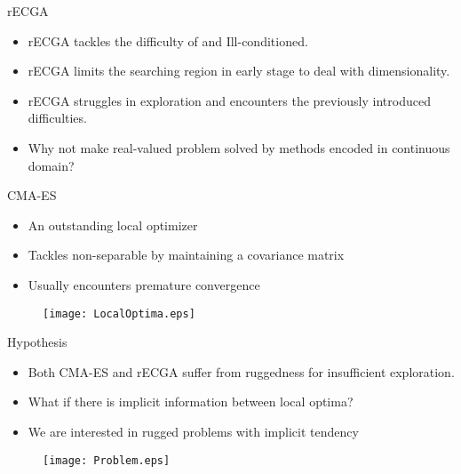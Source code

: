 \begin{frame}{rECGA}
  \begin{itemize}
    \item rECGA tackles the difficulty of
      and \alert{Ill-conditioned}.
      \vspace*{14pt}
    \item rECGA limits the searching region in early stage to deal with
      \alert{dimensionality}.
      \vspace*{14pt}
    \item rECGA struggles in exploration and encounters the previously
      introduced difficulties.
      \vspace*{14pt}
    \item Why not make real-valued problem solved by methods encoded in
      continuous domain?

  \end{itemize}
\end{frame}
\begin{frame}{CMA-ES}
  \begin{itemize}
    \item An outstanding local optimizer
    \item Tackles \alert{non-separable} by maintaining a
      covariance matrix
    \item Usually encounters premature convergence
  \end{itemize}
  \begin{figure}[htpb]
    \centering
    \vfill\texttt{[image: LocalOptima.eps]}
  \end{figure}
\end{frame}
\begin{frame}{Hypothesis}
  \begin{itemize}
    \item Both CMA-ES and rECGA suffer from \alert{ruggedness} for
      insufficient exploration.
      \vspace*{8pt}
    \item What if there is implicit information between local optima?
    \item We are interested in rugged problems with implicit tendency
  \end{itemize}
  \vspace*{10pt}
  \begin{figure}[hp]
    \centering
    \texttt{[image: Problem.eps]}
  \end{figure}
\end{frame}

